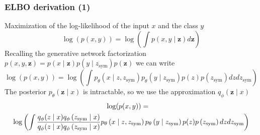 \documentclass[10pt,xcolor={dvipsnames}]{beamer}
\begin{document}


\begin{frame}
    \frametitle{ELBO derivation (1)}
    Maximization of the log-likelihood of the input $x$ and the class $y$
    $$
        \log (p(x, y))=\log \left(\int p(x, y \mid \mathbf{z}) d \mathbf{z}\right)
    $$
    Recalling the generative network factorization $p(x, y, \mathbf{z})=p(x \mid \mathbf{z}) p(y \mid z_{\text {sym}}) p(\mathbf{z})$ we can write
    $$
        \log (p(x, y)) =
        \log \left(\int p_{\theta}\left(x \mid z, z_{\text {sym}}\right) p_{\theta}\left(y \mid z_{\text {sym}}\right) p(z) p\left(z_{\text {sym}}\right) d z d z_{\text {sym}}\right)
    $$
    The posterior $p_{\theta}(\mathbf{z} \mid x)$ is intractable, so we use the approximation $q_{\phi}(\mathbf{z} \mid x)$
    {\small
    \begin{multline*}
        \hspace{-0.35cm}\log (p(x, y))=\\
        \log \left(\int \frac{q_{\phi}(z \mid x) q_{\phi}\left(z_{\text {sym}} \mid x\right)}{q_{\phi}(z \mid x) q_{\phi}\left(z_{\text {sym}} \mid x\right)} p_{\theta}\left(x \mid z, z_{\text {sym}}\right) p_{\theta}\left(y \mid z_{\text {sym}}\right) p(z) p\left(z_{\text {sym}}\right) d z d z_{\text {sym}}\right)
    \end{multline*}
    }
\end{frame}
\end{document}
